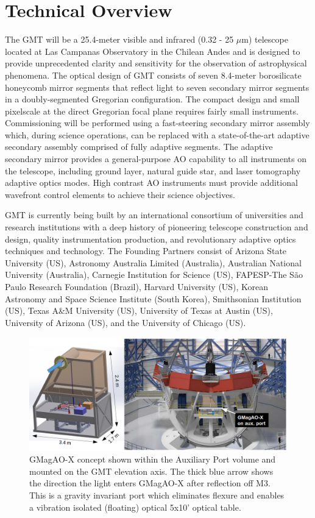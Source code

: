 \documentclass[12pt,preprint]{aastex}
\begin{document}
\section{Technical Overview}

The GMT will be a 25.4-meter visible and infrared (0.32 - 25 $\mu$m) telescope located at Las Campanas Observatory in the Chilean Andes and is designed to provide unprecedented clarity and sensitivity for the observation of astrophysical phenomena. The optical design of GMT consists of seven 8.4-meter borosilicate honeycomb mirror segments that reflect light to seven secondary mirror segments in a doubly-segmented Gregorian configuration. The compact design and small pixelscale at the direct Gregorian focal plane requires fairly small instruments. Commissioning will be performed using a fast-steering secondary mirror assembly which, during science operations, can be replaced with a state-of-the-art adaptive secondary assembly comprised of fully adaptive segments. The adaptive secondary mirror provides a general-purpose AO capability to all instruments on the telescope, including ground layer, natural guide star, and laser tomography adaptive optics modes. High contrast AO instruments must provide additional wavefront control elements to achieve their science objectives.

GMT is currently being built by an international consortium of universities and research institutions with a deep history of pioneering telescope construction and design, quality instrumentation production, and revolutionary adaptive optics techniques and technology. The Founding Partners consist of Arizona State University (US), Astronomy Australia Limited (Australia), Australian National University (Australia), Carnegie Institution for Science (US), FAPESP-The S\~ao Paulo Research Foundation (Brazil), Harvard University (US), Korean Astronomy and Space Science Institute (South Korea), Smithsonian Institution (US), Texas A\&M University (US), University of Texas at Austin (US), University of Arizona (US), and the University of Chicago (US).

\begin{figure}[h!]
\centering
\includegraphics[width=6in]{figures/ap.png}
\vspace{-0.1in}
\caption{ GMagAO-X concept shown within the Auxiliary Port volume and mounted on the GMT elevation axis. The thick blue arrow shows the direction the light enters GMagAO-X after reflection off M3. This is a gravity invariant port which eliminates flexure and enables a vibration isolated (floating) optical 5x10' optical table. \label{fig:ap}}
\vspace{-0.1in}
\end{figure}
\end{document}
